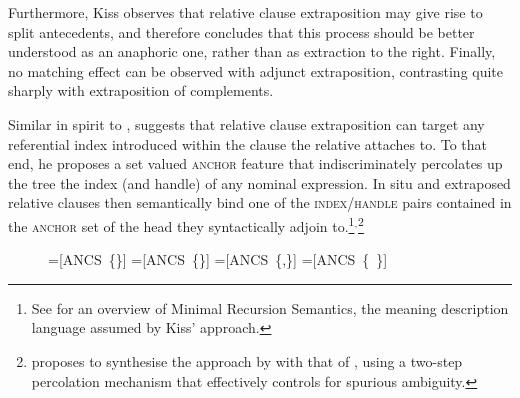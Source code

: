 \documentclass[output=paper
	        ,collection
	        ,collectionchapter
 	        ,biblatex
                ,babelshorthands
                ,newtxmath
                ,draftmode
                ,colorlinks, citecolor=brown
]{langscibook}
\begin{document}
{Furthermore, Kiss observes that relative clause extraposition may give
rise to split antecedents, and therefore concludes that this process
should be better understood as an anaphoric one, rather than as
extraction to the right. Finally, no matching effect can be observed
with adjunct extraposition, contrasting quite sharply with
extraposition of complements.


Similar in spirit to \citet{culicover90:_extrap_and_compl_princ},
\citet{kiss_t02nllt} suggests that relative clause extraposition can
target any referential index introduced within the clause the relative
attaches to.  To that end, he proposes a set valued \textsc{anchor}
feature that indiscriminately percolates up the tree the index (and
handle) of any nominal expression. In situ and extraposed relative
clauses then semantically bind one of the \textsc{index/handle} pairs
contained in the \textsc{anchor} set of the head they syntactically
adjoin to.\footnote{See
  for an overview of Minimal Recursion Semantics, the meaning
  description language assumed by Kiss'
  approach.}$^,$\footnote{\citet{crysmann_b04rlc} proposes to
  synthesise the approach by \citet{kiss_t02nllt} with that of
  \citet{Keller:95}, using a two-step percolation mechanism that
  effectively controls for spurious ambiguity.}

\begin{figure}
  
  { \newbox\onebox \newbox\twobox \newbox\onetwobox \newbox\emptybox

    \setbox\onebox=\hbox{[\textsc{ANCS} \{\}]}
    \setbox\twobox=\hbox{[\textsc{ANCS} \{\}]}
    \setbox\onetwobox=\hbox{[\textsc{ANCS} \{,\}]}
    \setbox\emptybox=\hbox{[\textsc{ANCS} \{ \}]}

}




\end{figure}

}
\end{document}
